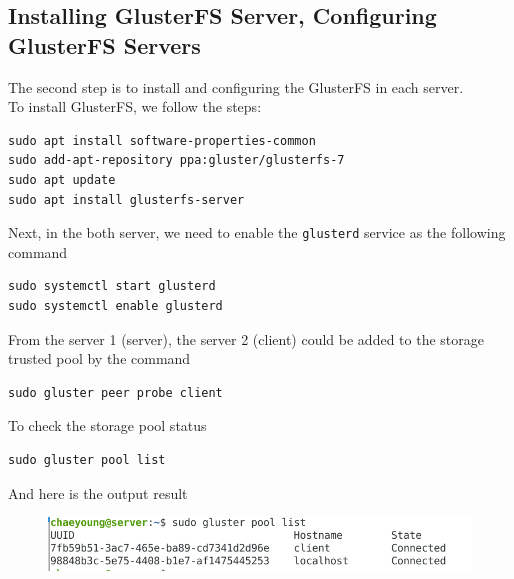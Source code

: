 \documentclass[times, 10pt]{thesisMDH}
\begin{document}
\subsection{Installing GlusterFS Server, Configuring GlusterFS Servers}
The second step is to install and configuring the GlusterFS in each server.\\
To install GlusterFS, we follow the steps:
\begin{lstlisting}
sudo apt install software-properties-common
sudo add-apt-repository ppa:gluster/glusterfs-7
sudo apt update
sudo apt install glusterfs-server
\end{lstlisting}
Next, in the both server, we need to enable the \texttt{glusterd} service as the following command
\begin{lstlisting}
sudo systemctl start glusterd
sudo systemctl enable glusterd
\end{lstlisting}
From the server 1 (server), the server 2 (client) could be added to the storage trusted pool by the command
\begin{lstlisting}
sudo gluster peer probe client
\end{lstlisting}
To check the storage pool status
\begin{lstlisting}
sudo gluster pool list
\end{lstlisting}
And here is the output result
\begin{figure}[H]
    \centering
    \includegraphics[width=0.7\linewidth]{images/cap1.png}
\end{figure}
\end{document}
